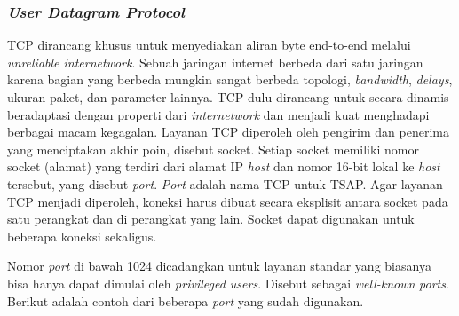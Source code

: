 
\subsubsection{\emph{User Datagram Protocol}}

TCP dirancang khusus untuk menyediakan aliran byte end-to-end melalui \emph{unreliable internetwork}. Sebuah jaringan internet berbeda dari satu jaringan karena bagian yang berbeda mungkin sangat berbeda topologi, \emph{bandwidth}, \emph{delays}, ukuran paket, dan parameter lainnya. TCP dulu dirancang untuk secara dinamis beradaptasi dengan properti dari \emph{internetwork} dan menjadi kuat menghadapi berbagai macam kegagalan. Layanan TCP diperoleh oleh pengirim dan penerima yang menciptakan akhir poin, disebut socket. Setiap socket memiliki nomor socket (alamat) yang terdiri dari alamat IP \emph{host} dan nomor 16-bit lokal ke \emph{host} tersebut, yang disebut \emph{port}. \emph{Port} adalah nama TCP untuk TSAP. Agar layanan TCP menjadi diperoleh, koneksi harus dibuat secara eksplisit antara socket pada satu perangkat dan di perangkat yang lain. Socket dapat digunakan untuk beberapa koneksi sekaligus. 

Nomor \emph{port} di bawah 1024 dicadangkan untuk layanan standar yang biasanya bisa hanya dapat dimulai oleh \emph{privileged users}. Disebut sebagai \emph{well-known} \emph{ports}. Berikut adalah contoh dari beberapa \emph{port} yang sudah digunakan.

